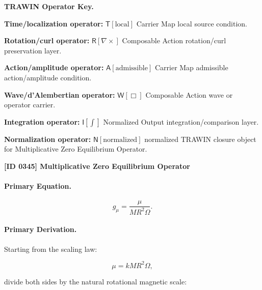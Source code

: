 \par\vspace{0.45\baselineskip}
\noindent\begin{minipage}[t]{\linewidth}
\begingroup
\small
\raggedright
\textbf{TRAWIN Operator Key.}\par
\noindent\textbf{Time/localization operator:} $\mathsf{T}\!\left[\mathrm{local}\right]$ Carrier Map local source condition.\par
\noindent\textbf{Rotation/curl operator:} $\mathsf{R}\!\left[\nabla\times\right]$ Composable Action rotation/curl preservation layer.\par
\noindent\textbf{Action/amplitude operator:} $\mathsf{A}\!\left[\mathrm{admissible}\right]$ Carrier Map admissible action/amplitude condition.\par
\noindent\textbf{Wave/d'Alembertian operator:} $\mathsf{W}\!\left[\Box\right]$ Composable Action wave or operator carrier.\par
\noindent\textbf{Integration operator:} $\mathsf{I}\!\left[\int\right]$ Normalized Output integration/comparison layer.\par
\noindent\textbf{Normalization operator:} $\mathsf{N}\!\left[\mathrm{normalized}\right]$ normalized TRAWIN closure object for Multiplicative Zero Equilibrium Operator.\par
\endgroup
\end{minipage}

\clearpage
\noindent\textbf{[ID 0345] Multiplicative Zero Equilibrium Operator}\par
\vspace{0.35em}
\paragraph{Primary Equation.}
\begin{equation}
g_{\mu}
=
\frac{\mu}
{MR^2\Omega}.
\end{equation}

\paragraph{Primary Derivation.}
Starting from the scaling law:

\begin{equation}
\mu
=
kMR^2\Omega ,
\end{equation}

divide both sides by the natural rotational magnetic scale:

